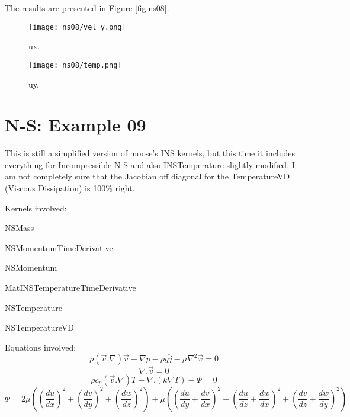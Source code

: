 \documentclass[11pt,letterpaper]{article}
\begin{document}
The results are presented in Figure \ref{fig:ns08}.
\begin{figure*}[!h]
	\centering
	\begin{subfigure}[t]{0.4\textwidth}
		\centering
		\texttt{[image: ns08/vel\_y.png]} 
		\caption{ux.}
		\label{fig:ns08-vel}
	\end{subfigure}
	\vspace{1cm}
	\begin{subfigure}[t]{0.4\textwidth}
		\centering
		\texttt{[image: ns08/temp.png]}
		\caption{uy.}
		\label{fig:ns08-temp}
	\end{subfigure}
	\hfill
	\caption{Temperature.}
	\label{fig:ns08}
\end{figure*}

\section{N-S: Example 09}

This is still a simplified version of moose's INS kernels, but this time it includes everything for Incompressible N-S and also INSTemperature slightly modified.
I am not completely sure that the Jacobian off diagonal for the TemperatureVD (Viscous Dissipation) is 100$\%$ right.

Kernels involved:
\begin{description}[font=$\bullet$\scshape\bfseries]
	\item[] NSMass
	\item[] NSMomentumTimeDerivative
	\item[] NSMomentum
	\item[] MatINSTemperatureTimeDerivative
	\item[] NSTemperature
	\item[] NSTemperatureVD
\end{description}

Equations involved:
\begin{equation}
\rho (\vec{v}.\nabla)\vec{v} + \nabla p - \rho g \check{j} - \mu \nabla^{2}\vec{v} = 0
\end{equation}
\begin{equation}
\nabla.\vec{v}=0
\end{equation}
\begin{equation}
\rho c_{p} (\vec{v}.\nabla)T - \nabla .(k\nabla T) - \Phi = 0
\end{equation}
\begin{equation}
\Phi = 2\mu((\frac{du}{dx})^2+(\frac{dv}{dy})^2+(\frac{dw}{dz})^2)+
\mu ((\frac{du}{dy}+\frac{dv}{dx})^2+(\frac{du}{dz}+\frac{dw}{dx})^2+(\frac{dv}{dz}+\frac{dw}{dy})^2)
\end{equation}
\end{document}
